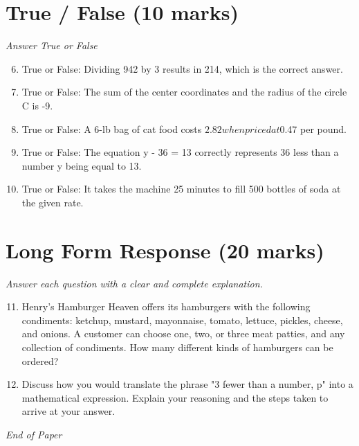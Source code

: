 \documentclass[12pt]{article}
\begin{document}
\section*{True / False (10 marks)}
\textit{Answer True or False}
\begin{enumerate}[label=\arabic*.]
\setcounter{enumi}{5}
\item True or False: Dividing 942 by 3 results in 214, which is the correct answer.
\item True or False: The sum of the center coordinates and the radius of the circle C is -9.
\item True or False: A 6-lb bag of cat food costs $2.82 when priced at $0.47 per pound.
\item True or False: The equation y - 36 = 13 correctly represents 36 less than a number y being equal to 13.
\item True or False: It takes the machine 25 minutes to fill 500 bottles of soda at the given rate.
\end{enumerate}

\section*{Long Form Response (20 marks)}
\textit{Answer each question with a clear and complete explanation.}
\begin{enumerate}[label=\arabic*.]
\setcounter{enumi}{10}
\item Henry's Hamburger Heaven offers its hamburgers with the following condiments: ketchup, mustard, mayonnaise, tomato, lettuce, pickles, cheese, and onions. A customer can choose one, two, or three meat patties, and any collection of condiments. How many different kinds of hamburgers can be ordered?
\item Discuss how you would translate the phrase "3 fewer than a number, p" into a mathematical expression. Explain your reasoning and the steps taken to arrive at your answer.
\end{enumerate}

\vfill
\noindent\textit{End of Paper}
\end{document}
